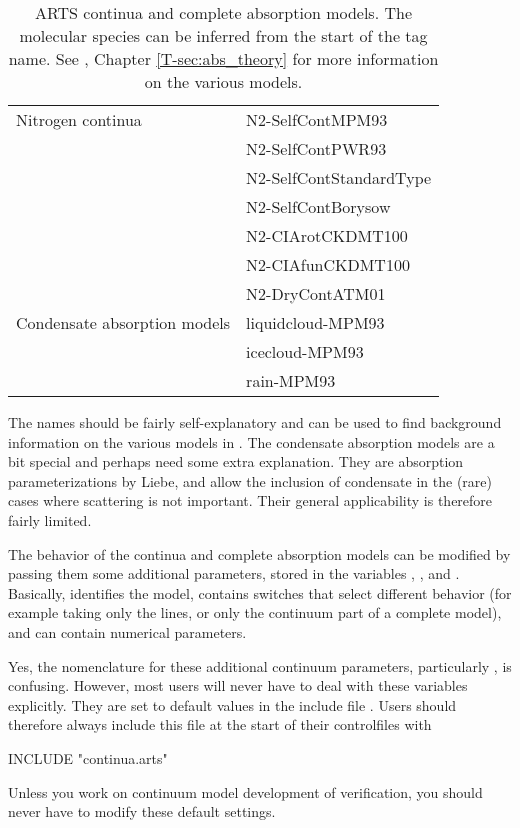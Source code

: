\begin{table}
\begin{tabular}{ll}
Nitrogen continua & N2-SelfContMPM93 \\
& N2-SelfContPWR93 \\
& N2-SelfContStandardType \\
& N2-SelfContBorysow \\
& N2-CIArotCKDMT100 \\
& N2-CIAfunCKDMT100 \\
& N2-DryContATM01 \\[1ex]

Condensate absorption models & liquidcloud-MPM93 \\
& icecloud-MPM93 \\
& rain-MPM93 \\

\hline  
\end{tabular}
\caption{ARTS continua and complete absorption models. The molecular
  species can be inferred from the start of the tag name.  See
  \theory, Chapter \ref{T-sec:abs_theory} for more information on the
  various models.}
\label{tab:absorption:continua}
\end{table}

The names should be fairly self-explanatory and can be used to find
background information on the various models in \theory.  The
condensate absorption models are a bit special and perhaps need some
extra explanation. They are absorption parameterizations by Liebe, and
allow the inclusion of condensate in the (rare) cases where scattering
is not important. Their general applicability is therefore fairly limited.

The behavior of the continua and complete absorption models can be
modified by passing them some additional parameters, stored in the
variables , ,
and . Basically,
 identifies the model,
 contains switches that select different
behavior (for example taking only the lines, or only the continuum
part of a complete model), and  can
contain numerical parameters. 

Yes, the nomenclature for these additional continuum parameters,
particularly , is confusing. However,
most users will never have to deal with these variables
explicitly. They are set to default values in the include file
. Users should therefore always include this file  at
the start of their controlfiles with
\begin{code}
  INCLUDE "continua.arts"
\end{code}
Unless you work on continuum model development of verification, you
should never have to modify these default settings.

